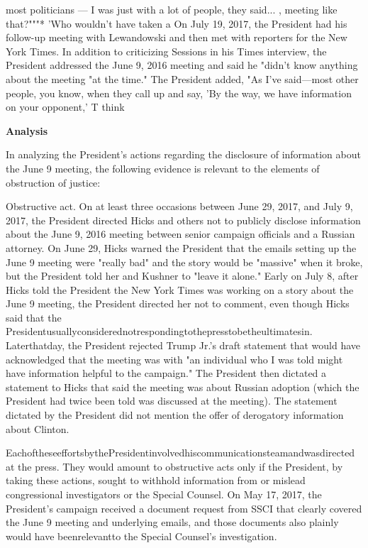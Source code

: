 most politicians — I was just with a lot of people, they said... , meeting like that?"""*
'Who wouldn't have taken a
On July 19, 2017, the President had his follow-up meeting with Lewandowski and then met with reporters for the New York Times.
In addition to criticizing Sessions in his Times interview, the President addressed the June 9, 2016 meeting and said he "didn't know anything about the meeting "at the time."
The President added, "As I've said—most other people, you know, when they call up and say, 'By the way, we have information on your opponent,' T think

\begin{center}
\textbf{Analysis}
\end{center}

In analyzing the President's actions regarding the disclosure of information about the June 9 meeting, the following evidence is relevant to the elements of obstruction of justice:

Obstructive act.
On at least three occasions between June 29, 2017, and July 9, 2017, the President directed Hicks and others not to publicly disclose information about the June 9, 2016 meeting between senior campaign officials and a Russian attorney.
On June 29, Hicks warned the President that the emails setting up the June 9 meeting were "really bad" and the story would be "massive" when it broke, but the President told her and Kushner to "leave it alone."
Early on July 8, after Hicks told the President the New York Times was working on a story about the June 9 meeting, the President directed her not to comment, even though Hicks said that the Presidentusuallyconsiderednotrespondingtothepresstobetheultimatesin.
Laterthatday, the President rejected Trump Jr.'s draft statement that would have acknowledged that the meeting was with "an individual who I was told might have information helpful to the campaign." The President then dictated a statement to Hicks that said the meeting was about Russian adoption (which the President had twice been told was discussed at the meeting).
The statement dictated by the President did not mention the offer of derogatory information about Clinton.

EachoftheseeffortsbythePresidentinvolvedhiscommunicationsteamandwasdirected at the press.
They would amount to obstructive acts only if the President, by taking these actions, sought to withhold information from or mislead congressional investigators or the Special Counsel.
On May 17, 2017, the President's campaign received a document request from SSCI that clearly covered the June 9 meeting and underlying emails, and those documents also plainly would have beenrelevantto the Special Counsel's investigation.

